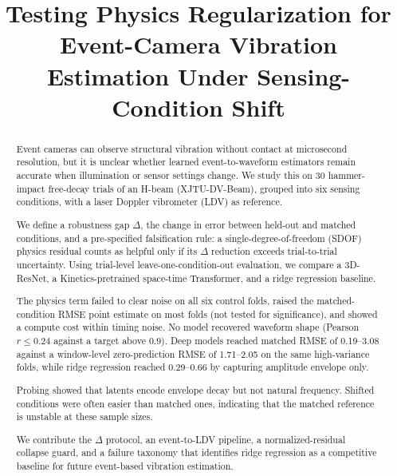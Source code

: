 \documentclass[conference]{IEEEtran}
\begin{document}
\title{Testing Physics Regularization for Event-Camera Vibration Estimation Under Sensing-Condition Shift}

\author{
}

\maketitle

\begin{abstract}
Event cameras can observe structural vibration without contact at microsecond resolution, but it is unclear whether learned event-to-waveform estimators remain accurate when illumination or sensor settings change. We study this on 30 hammer-impact free-decay trials of an H-beam (XJTU-DV-Beam), grouped into six sensing conditions, with a laser Doppler vibrometer (LDV) as reference.

We define a robustness gap $\Delta$, the change in error between held-out and matched conditions, and a pre-specified falsification rule: a single-degree-of-freedom (SDOF) physics residual counts as helpful only if its $\Delta$ reduction exceeds trial-to-trial uncertainty. Using trial-level leave-one-condition-out evaluation, we compare a 3D-ResNet, a Kinetics-pretrained space-time Transformer, and a ridge regression baseline.

The physics term failed to clear noise on all six control folds, raised the matched-condition RMSE point estimate on most folds (not tested for significance), and showed a compute cost within timing noise. No model recovered waveform shape (Pearson $r \leq 0.24$ against a target above $0.9$). Deep models reached matched RMSE of 0.19--3.08 against a window-level zero-prediction RMSE of 1.71--2.05 on the same high-variance folds, while ridge regression reached 0.29--0.66 by capturing amplitude envelope only.

Probing showed that latents encode envelope decay but not natural frequency. Shifted conditions were often easier than matched ones, indicating that the matched reference is unstable at these sample sizes.

We contribute the $\Delta$ protocol, an event-to-LDV pipeline, a normalized-residual collapse guard, and a failure taxonomy that identifies ridge regression as a competitive baseline for future event-based vibration estimation.
\end{abstract}
\end{document}
